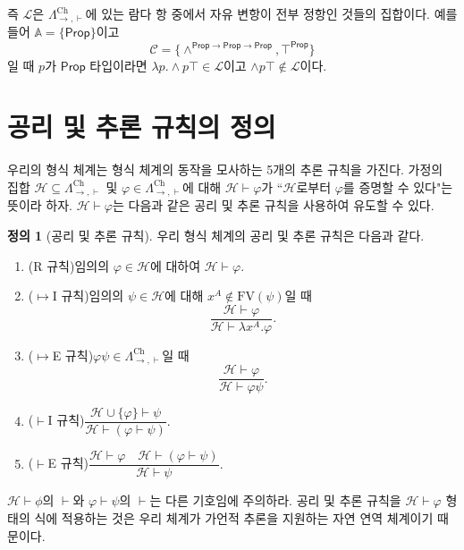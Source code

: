 \documentclass[10pt,twocolumn]{article}
\theoremstyle{definition}
\newtheorem{definition}[theorem]{정의}
\newcommand{\Prop}{\mathsf{Prop}}
\newcommand{\Lchh}{\Lambda_{\to,\vdash}^{\text{Ch}}}
\begin{document}
즉 $\mathcal L$은 $\Lchh$에 있는 람다 항 중에서 자유 변항이 전부 정항인 것들의 집합이다. 예를 들어 $\mathbb A = \{\Prop\}$이고 $$\mathcal C = \{\land^{\Prop\to\Prop\to\Prop}, \top^{\Prop}\}$$일 때 $p$가 $\Prop$ 타입이라면 $\lambda p.{\land}p\top\in\mathcal L$이고 ${\land}p\top\notin\mathcal L$이다.

\section{공리 및 추론 규칙의 정의}

우리의 형식 체계는 형식 체계의 동작을 모사하는 5개의 추론 규칙을 가진다. 가정의 집합 $\mathcal H\subseteq\Lchh$ 및 $\varphi\in\Lchh$에 대해 $\mathcal H\vdash\varphi$가 ``$\mathcal H$로부터 $\varphi$를 증명할 수 있다"는 뜻이라 하자. $\mathcal H\vdash\varphi$는 다음과 같은 공리 및 추론 규칙을 사용하여 유도할 수 있다.

\begin{definition}[공리 및 추론 규칙]
	우리 형식 체계의 공리 및 추론 규칙은 다음과 같다.
	
	\begin{enumerate}
		\item (R 규칙)\quad 임의의 $\varphi\in\mathcal H$에 대하여 $\mathcal H\vdash\varphi.$
		\item ($\mapsto$I 규칙)\quad 임의의 $\psi\in\mathcal H$에 대해 $x^A\notin\mathrm{FV}(\psi)$일 때 $$\dfrac{\mathcal H\vdash\varphi}{\mathcal H\vdash\lambda x^A.\varphi}.$$
		\item ($\mapsto$E 규칙)\quad $\varphi\psi\in\Lchh$일 때 $$\dfrac{\mathcal H\vdash\varphi}{\mathcal H\vdash\varphi\psi}.$$
		\item ($\vdash$I 규칙)\quad $\dfrac{\mathcal H\cup\{\varphi\}\vdash\psi}{\mathcal H\vdash(\varphi\vdash\psi)}.$
		\item ($\vdash$E 규칙)\quad $\dfrac{\mathcal H\vdash\varphi\quad\mathcal H\vdash(\varphi\vdash\psi)}{\mathcal H\vdash\psi}.$
	\end{enumerate}
\end{definition}

$\mathcal H\vdash\phi$의 $\vdash$와 $\varphi\vdash\psi$의 $\vdash$는 다른 기호임에 주의하라. 공리 및 추론 규칙을 $\mathcal H\vdash\varphi$ 형태의 식에 적용하는 것은 우리 체계가 가언적 추론을 지원하는 자연 연역 체계이기 때문이다.
\end{document}
